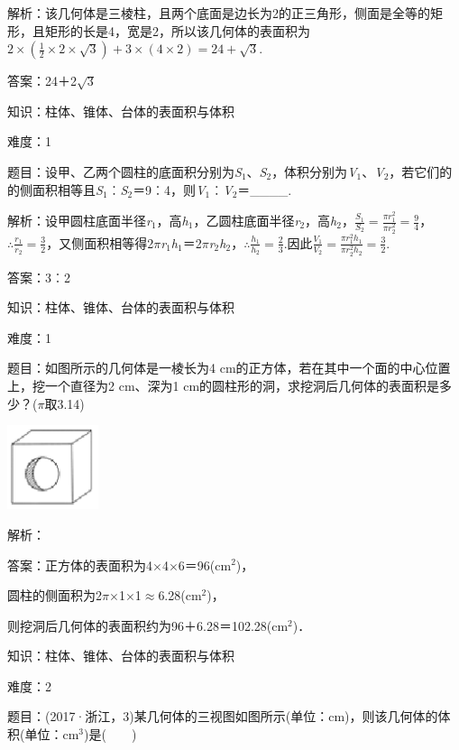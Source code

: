 \documentclass{article} %
\begin{document}
解析：该几何体是三棱柱，且两个底面是边长为2的正三角形，侧面是全等的矩形，且矩形的长是4，宽是2，所以该几何体的表面积为$2\times(\frac{1}{2}\times 2\times\sqrt{3})+3\times (4\times 2)=24+\sqrt{3}$.

答案：24＋2$\sqrt{3}$

知识：柱体、锥体、台体的表面积与体积

难度：1

题目：设甲、乙两个圆柱的底面积分别为\textit{S}${}_{1}$、\textit{S}${}_{2}$，体积分别为\textit{V}${}_{1}$、\textit{V}${}_{2}$，若它们的的侧面积相等且\textit{S}${}_{1}$︰\textit{S}${}_{2}$＝9︰4，则\textit{V}${}_{1}$︰\textit{V}${}_{2}$＝\_\_\_\_.

解析：设甲圆柱底面半径\textit{r}${}_{1}$，高\textit{h}${}_{1}$，乙圆柱底面半径\textit{r}${}_{2}$，高\textit{h}${}_{2}$，$\frac{S_1}{S_2}=\frac{\pi r_1^2}{\pi r_2^2}=\frac{9}{4}$，$\mathrm{\therefore}\frac{r_1}{r_2}=\frac{3}{2}$，又侧面积相等得2\textit{$\pi$r}${}_{1}$\textit{h}${}_{1}$＝2\textit{$\pi$r}${}_{2}$\textit{h}${}_{2}$，$\mathrm{\therefore}\frac{h_1}{h_2}=\frac{2}{3}$.因此$\frac{V_1}{V_2}=\frac{\pi r_1^2h_1}{\pi r_2^2h_2}=\frac{3}{2}$.

答案：3︰2

知识：柱体、锥体、台体的表面积与体积

难度：1

题目：如图所示的几何体是一棱长为4 cm的正方体，若在其中一个面的中心位置上，挖一个直径为2 cm、深为1 cm的圆柱形的洞，求挖洞后几何体的表面积是多少？($\pi$取3.14)

\includegraphics*[width=1.06in, height=0.97in, keepaspectratio=false]{image66}

解析：

答案：正方体的表面积为4$\mathrm{\times}$4$\mathrm{\times}$6＝96(cm${}^{2}$)，

圆柱的侧面积为2$\pi$$\mathrm{\times}$1$\mathrm{\times}$1$\mathrm{\approx}$6.28(cm${}^{2}$)，

则挖洞后几何体的表面积约为96＋6.28＝102.28(cm${}^{2}$)．

知识：柱体、锥体、台体的表面积与体积

难度：2

题目：(2017·浙江，3)某几何体的三视图如图所示(单位：cm)，则该几何体的体积(单位：cm${}^{3}$)是(　　)
\end{document}

